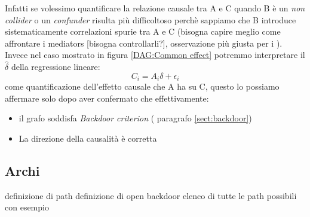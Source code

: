 Infatti se volessimo quantificare la relazione causale tra A e C quando B è un \textit{non collider} o  un \textit{confunder} risulta più difficoltoso perchè sappiamo che B introduce  sistematicamente correlazioni spurie tra A e C (bisogna capire meglio come affrontare i mediators [bisogna controllarli?], osservazione più giusta per i ). Invece nel caso mostrato in figura \ref{DAG:Common effect} potremmo interpretare il $\hat{\delta}$ della regressione lineare:
\begin{equation}
C_i= A_i\delta + \epsilon_i
\end{equation}
come quantificazione dell'effetto causale che A ha su C, questo lo possiamo affermare solo dopo aver confermato che effettivamente:
\begin{itemize}
\item il grafo soddisfa \textit{Backdoor criterion} ( paragrafo \ref{sect:backdoor})
\item La direzione della causalità è corretta
\end{itemize}

\subsection{Archi}
definizione di path
definizione di open backdoor 
elenco di tutte le path possibili  con esempio




%

